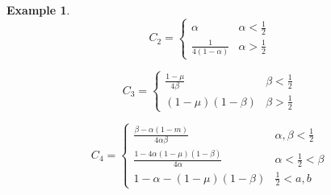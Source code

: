 \documentclass[11pt]{article}
\theoremstyle{definition}
\newtheorem{ex}[thm]{Example}
\numberwithin{equation}{section}
\numberwithin{thm}{section}
\renewcommand{\a}{\alpha}
\renewcommand{\b}{\beta}
\newcommand{\m}{\mu}
\begin{document}
\begin{ex}
\newcommand{\Ctwocaseone}{\a}
\newcommand{\Ctwocasetwo}{\frac{1}{4(1-\a)}}

\begin{equation}
C_2 = \begin{cases}
\Ctwocaseone & \a < \frac{1}{2} \\
\Ctwocasetwo & \a > \frac{1}{2}
\end{cases} \end{equation}

\newcommand{\Cthreecaseone}{\frac{1-\m}{4\b}}
\newcommand{\Cthreecasetwo}{(1-\m)(1-\b)}

\begin{equation}
C_3 = \begin{cases}
\Cthreecaseone & \b < \frac{1}{2} \\
\Cthreecasetwo & \b > \frac{1}{2}
\end{cases} \end{equation}

\newcommand{\Cfourcaseone}{\frac{\b-\a(1-m)}{4\a\b}}
\newcommand{\Cfourcasetwo}{\frac{1-4\a(1-\m)(1-\b)}{4\a}}
\newcommand{\Cfourcasethree}{1-\a-(1-\m)(1-\b)}

\begin{equation}
C_4 = \begin{cases}
\Cfourcaseone & \a,\b < \frac{1}{2} \\
\Cfourcasetwo & \a<\frac{1}{2}<\b \\
\Cfourcasethree & \frac{1}{2}<a,b
\end{cases} \end{equation}


\end{ex}
\end{document}
